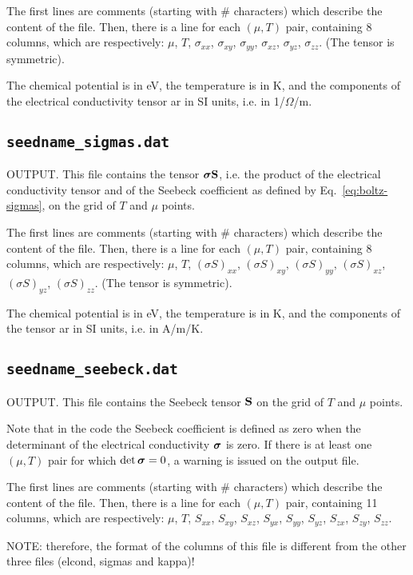 The first lines are comments (starting with \# characters) which describe the content of the file.
Then, there is a line for each $(\mu,T)$ pair, containing 8 columns, which are respectively: $\mu$, $T$, $\sigma_{xx}$, $\sigma_{xy}$, $\sigma_{yy}$, $\sigma_{xz}$, $\sigma_{yz}$, $\sigma_{zz}$. (The tensor is symmetric).

The chemical potential is in eV, the temperature is in K, and the components of the electrical conductivity tensor ar in SI units, i.e. in 1/$\Omega$/m.

\subsection{{\tt seedname\_sigmas.dat}}
OUTPUT. This file contains the tensor $\bm{\mathrm{\sigma}}\bm{\mathrm{S}}$, i.e. the product of the electrical conductivity tensor and of the Seebeck coefficient as defined by Eq.~\eqref{eq:boltz-sigmas}, on the grid of $T$ and $\mu$ points. 

The first lines are comments (starting with \# characters) which describe the content of the file.
Then, there is a line for each $(\mu,T)$ pair, containing 8 columns, which are respectively: $\mu$, $T$, $(\sigma S)_{xx}$, $(\sigma S)_{xy}$, $(\sigma S)_{yy}$, $(\sigma S)_{xz}$, $(\sigma S)_{yz}$, $(\sigma S)_{zz}$. (The tensor is symmetric).

The chemical potential is in eV, the temperature is in K, and the components of the tensor ar in SI units, i.e. in A/m/K.

\subsection{{\tt seedname\_seebeck.dat}}
OUTPUT. This file contains the Seebeck tensor $\bm{\mathrm{S}}$ on the grid of $T$ and $\mu$ points. 

Note that in the code the Seebeck coefficient is defined as zero when the determinant of the electrical conductivity $\bm{\mathrm{\sigma}}$ is zero. If there is at least one $(\mu, T)$ pair for which $\det \bm{\mathrm{\sigma}}=0$, a warning is issued on the output file.

The first lines are comments (starting with \# characters) which describe the content of the file.
Then, there is a line for each $(\mu,T)$ pair, containing 11 columns, which are respectively: $\mu$, $T$, $S_{xx}$, $S_{xy}$, $S_{xz}$, $S_{yx}$, $S_{yy}$, $S_{yz}$, $S_{zx}$, $S_{zy}$, $S_{zz}$.

NOTE: therefore, the format of the columns of this file is different from the other three files (elcond, sigmas and kappa)!

